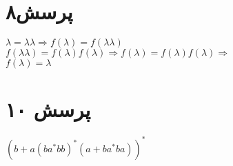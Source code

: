 \documentclass[a4paper]{article}
\begin{document}
\section*{پرسش۸}
$\lambda = \lambda\lambda \Rightarrow f(\lambda) = f(\lambda\lambda) $
\\
$f(\lambda\lambda) = f(\lambda)f(\lambda) \Rightarrow f(\lambda) = f(\lambda)f(\lambda) \Rightarrow$
\\
$f(\lambda) = \lambda$

\section*{پرسش ۱۰}
\begin{enumerate}
\begin{latin}
\item{}
\item{}
\item{}
\item{}
$(b + a(ba^*bb)^*(a + ba^*ba))^*$
\end{latin}
\end{enumerate}
\end{document}
